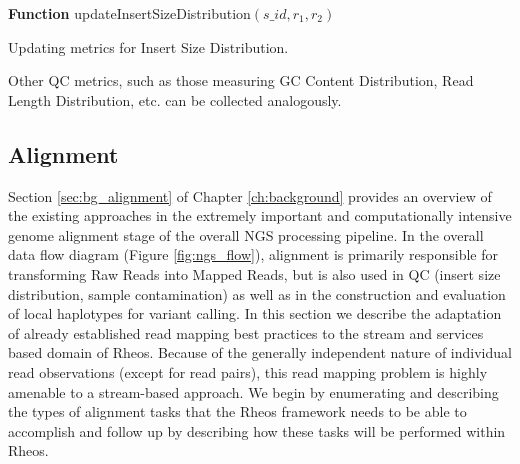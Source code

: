 \begin{algorithm2e}[h]
    \DontPrintSemicolon
    \footnotesize
    \textbf{Function} {\sc updateInsertSizeDistribution}$(s\_id, r_1,r_2)$
    \caption{Updating metrics for Insert Size Distribution.}\label{ag:update_metrics_isd}
\end{algorithm2e}

Other QC metrics, such as those measuring GC Content Distribution, Read Length Distribution, etc. can be collected analogously. 

\subsection{Alignment}\label{sec:main_body_alignment}

Section \ref{sec:bg_alignment} of Chapter \ref{ch:background} provides an overview of the existing approaches in the extremely important and computationally intensive genome alignment stage of the overall NGS processing pipeline. In the overall data flow diagram (Figure \ref{fig:ngs_flow}), alignment is primarily responsible for transforming Raw Reads into Mapped Reads, but is also used in QC (insert size distribution, sample contamination) as well as in the construction and evaluation of local haplotypes for variant calling. In this section we describe the adaptation of already established read mapping best practices to the stream and services based domain of Rheos. Because of the generally independent nature of individual read observations (except for read pairs), this read mapping problem is highly amenable to a stream-based approach. We begin by enumerating and describing the types of alignment tasks that the Rheos framework needs to be able to accomplish and follow up by describing how these tasks will be performed within Rheos.


